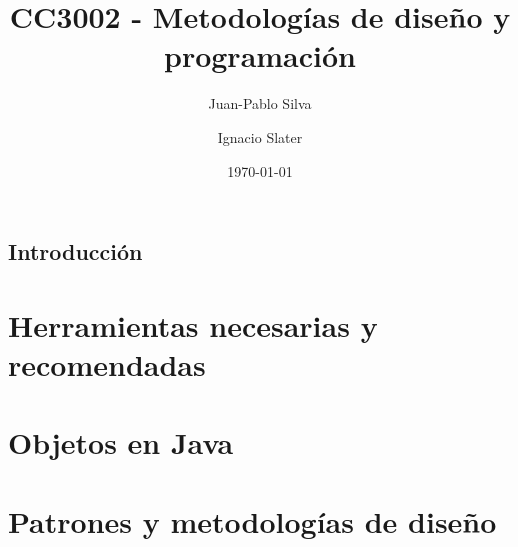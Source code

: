 \documentclass[12pt]{book}
\title{CC3002 - Metodologías de diseño y programación}
\author{Juan-Pablo Silva}
\author{Ignacio Slater}
\affil{Departamento de Ciencias de la Computación, Universidad de Chile}
\date{\today}
\begin{document}
  \frontmatter
  \maketitle
  \tableofcontents
  \chapter{Introducción}

  \mainmatter
  \part{Herramientas necesarias y recomendadas}
    
  \part{Objetos en Java}
    
  \part{Patrones y metodologías de diseño}
\end{document}
